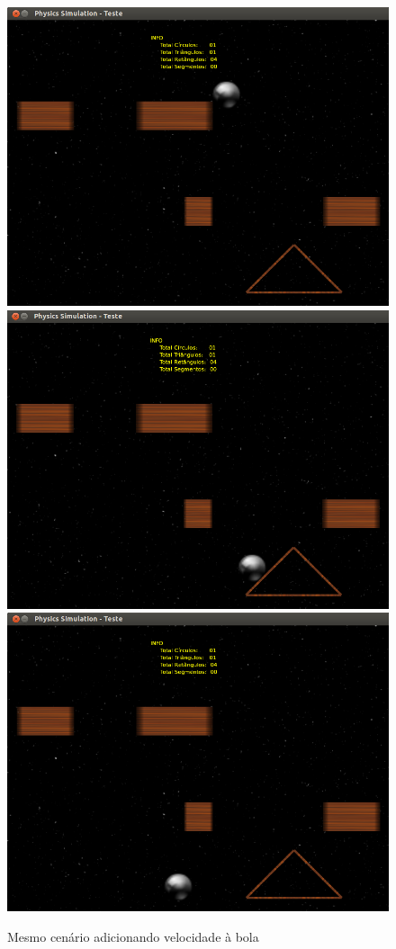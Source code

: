 \begin{figure}[H]
	\centering
	\includegraphics[scale=0.2]{images/cenario-mono-2.png}
	\includegraphics[scale=0.2]{images/cenario-mono-3.png}
	\includegraphics[scale=0.2]{images/cenario-mono-4.png}
	\caption{Mesmo cenário adicionando velocidade à bola}
\end{figure}

